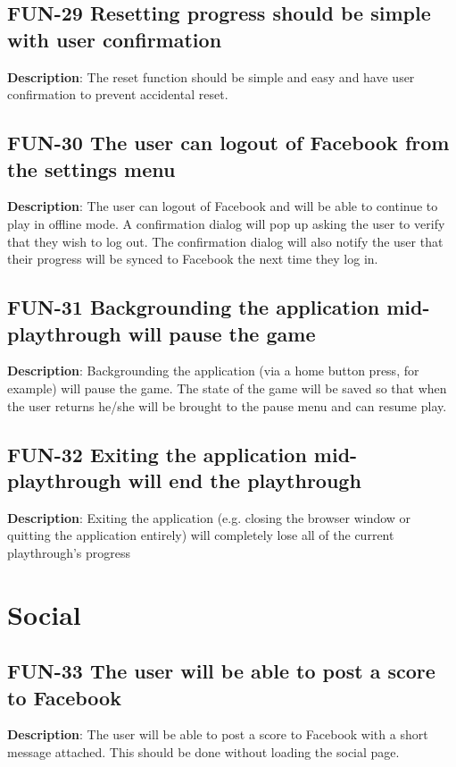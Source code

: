\subsection{FUN-29 Resetting progress should be simple with user confirmation}
\textbf{Description}: The reset function should be simple and easy
and have user confirmation to prevent accidental reset.

\subsection{FUN-30 The user can logout of Facebook from the settings menu}
\textbf{Description}: The user can logout of Facebook and will be
able to continue to play in offline mode. A confirmation dialog will
pop up asking the user to verify that they wish to log out. The confirmation
dialog will also notify the user that their progress will be synced
to Facebook the next time they log in.

\subsection{FUN-31 Backgrounding the application mid-playthrough will pause
the game}
\textbf{Description}: Backgrounding the application (via a home button
press, for example) will pause the game. The state of the game will
be saved so that when the user returns he/she will be brought to the
pause menu and can resume play.

\subsection{FUN-32 Exiting the application mid-playthrough will end the playthrough}
\textbf{Description}: Exiting the application (e.g. closing the browser
window or quitting the application entirely) will completely lose
all of the current playthrough\textquoteright{}s progress

\section{Social}

\subsection{FUN-33 The user will be able to post a score to Facebook}
\textbf{Description}: The user will be able to post a score to Facebook
with a short message attached. This should be done without loading
the social page.

